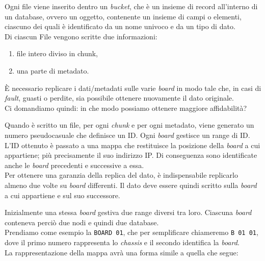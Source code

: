 Ogni file viene inserito dentro un \textit{bucket}, che \`{e} un insieme di record all'interno di un database, ovvero un oggetto, contenente un insieme di campi o elementi, ciascuno dei quali \`{e} identificato da un nome univoco e da un tipo di dato.\\

Di ciascun File vengono scritte due informazioni:
\begin{enumerate}
\item 
file intero diviso in chunk,
\item
una parte di metadato.\\
\end{enumerate}

\`{E} necessario replicare i dati/metadati sulle varie \textit{board} in modo tale che, in casi di \textit{fault}, guasti o perdite, sia possibile ottenere nuovamente il dato originale.\\

Ci domandiamo quindi: in che modo possiamo ottenere maggiore affidabilit\`{a}?


Quando \`{e} scritto un file, per ogni \textit{chunk} e per ogni metadato, viene generato un numero pseudocasuale che definisce un ID. 
Ogni \textit{board} gestisce un range di ID.
L'ID ottenuto \`{e} passato a una mappa che restituisce la posizione della \textit{board} a cui appartiene; pi\`{u} precisamente il suo indirizzo IP. Di conseguenza sono identificate anche le \textit{board} precedenti e successive a essa.\\
Per ottenere una garanzia della replica del dato, \`{e} indispensabile replicarlo almeno due volte su \textit{board} differenti. Il dato deve essere quindi scritto sulla \textit{board} a cui appartiene e sul suo successore.

Inizialmente una stessa \textit{board} gestiva due range diversi tra loro. Ciascuna \textit{board} conteneva perci\`{o} due nodi e quindi due database.\\
Prendiamo come esempio la \verb"BOARD 01", che per semplificare chiameremo \verb"B 01 01", dove il primo numero rappresenta lo \textit{chassis} e il secondo identifica la \textit{board}.\\
La rappresentazione della mappa avr\`{a} una forma simile a quella che segue:\\

